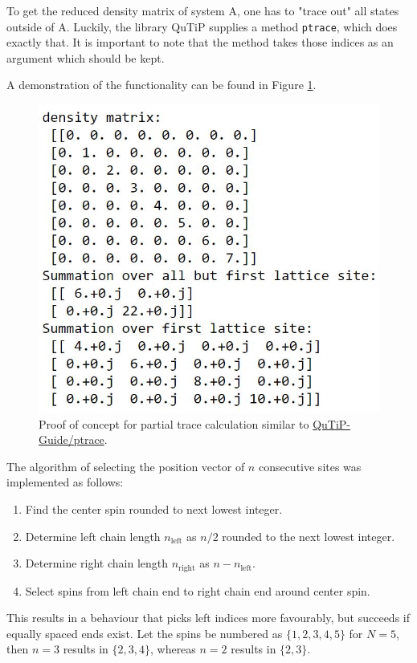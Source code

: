 \documentclass[reprint,amsmath,amssymb,aps,prb]{revtex4-2}
\begin{document}
To get the reduced density matrix of system A, one has to "trace out" all states outside of A. Luckily, the library QuTiP supplies a method \texttt{ptrace}, which does exactly that. It is important to note that the method takes those indices as an argument which should be kept.\cite{Johansson2012}

A demonstration of the functionality can be found in Figure \ref{fig:partialtrace_proof_of_concept}.

\begin{figure}[h!]
\centering
\includegraphics[width=0.7\linewidth]{figures/partialtrace_proof_of_concept}
\caption{Proof of concept for partial trace calculation similar to \protect\hyperlink{http://qutip.org/docs/3.1.0/guide/guide-tensor.html}{QuTiP-Guide/ptrace}.}
\label{fig:partialtrace_proof_of_concept}
\end{figure}

The algorithm of selecting the position vector of $n$ consecutive sites was implemented as follows: 
\begin{enumerate}
	\item Find the center spin rounded to next lowest integer.
	\item Determine left chain length $n_\text{left}$ as $n/2$ rounded to the next lowest integer.
	\item Determine right chain length $n_\text{right}$ as $n-n_\text{left}$.
	\item Select spins from left chain end to right chain end around center spin.
\end{enumerate}
This results in a behaviour that picks left indices more favourably, but succeeds if equally spaced ends exist. Let the spins be numbered as $\{1, 2, 3, 4, 5\}$ for $N=5$, then  $n=3$ results in $\{2, 3, 4\}$, whereas $n=2$ results in $\{2, 3\}$.
\end{document}
